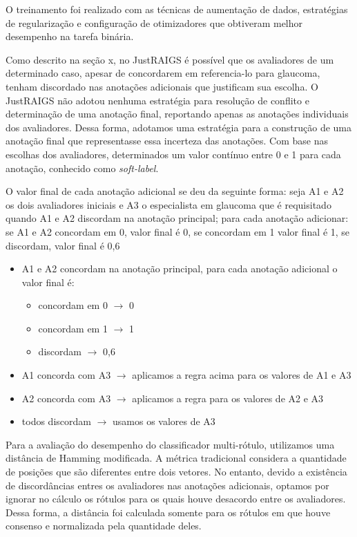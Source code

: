 \documentclass[12pt]{article}
\begin{document}
O treinamento foi realizado com as técnicas de aumentação de dados, estratégias de regularização e configuração de otimizadores que obtiveram melhor desempenho na tarefa binária.

Como descrito na seção x, no JustRAIGS é possível que os avaliadores de um determinado caso, apesar de concordarem em referencia-lo para glaucoma, tenham discordado nas anotações adicionais que justificam sua escolha. O JustRAIGS não adotou nenhuma estratégia para resolução de conflito e determinação de uma anotação final, reportando apenas as anotações individuais dos avaliadores. Dessa forma, adotamos uma estratégia para a construção de uma anotação final que representasse essa incerteza das anotações. Com base nas escolhas dos avaliadores, determinados um valor contínuo entre 0 e 1 para cada anotação, conhecido como \textit{soft-label}.


O valor final de cada anotação adicional se deu da seguinte forma: seja A1 e A2 os dois avaliadores iniciais e A3 o especialista em glaucoma que é requisitado quando A1 e A2 discordam na anotação principal;
para cada anotação adicionar: se A1 e A2 concordam em 0, valor final é 0, se concordam em 1 valor final é 1, se discordam, valor final é 0,6


\begin{itemize}[noitemsep,topsep=0pt]
    \item A1 e A2 concordam na anotação principal, para cada anotação adicional o valor final é:
        \begin{itemize}
            \item concordam em 0 $\rightarrow$ 0
            \item concordam em 1 $\rightarrow$ 1
            \item discordam $\rightarrow$ 0,6
        \end{itemize}
    \item A1 concorda com A3 $\rightarrow$ aplicamos a regra acima para os valores de A1 e A3
    \item A2 concorda com A3 $\rightarrow$ aplicamos a regra para os valores de A2 e A3
    \item todos discordam $\rightarrow$ usamos os valores de A3
\end{itemize}


Para a avaliação do desempenho do classificador multi-rótulo, utilizamos uma distância de Hamming modificada. A métrica tradicional considera a quantidade de posições que são diferentes entre dois vetores. No entanto, devido a existência de discordâncias entres os avaliadores nas anotações adicionais, optamos por ignorar no cálculo os rótulos para os quais houve desacordo entre os avaliadores. Dessa forma, a distância foi calculada somente para os rótulos em que houve consenso e normalizada pela quantidade deles. 
\end{document}
